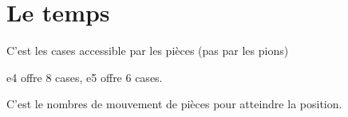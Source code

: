 
\chapter{Le temps}


C'est les cases accessible par les pièces (pas par les pions)

e4 offre 8 cases, e5 offre 6 cases.


C'est le nombres de mouvement de pièces pour atteindre la position.






\mbox{}
\bigskip

\showboard









